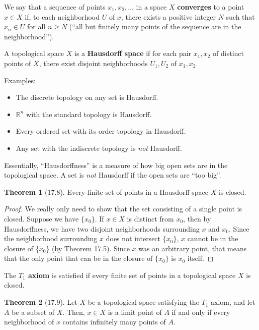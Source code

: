 \documentclass{article}
\newcommand{\nline}{\vspace*{0.5\baselineskip}}
\theoremstyle{definition}
\newtheorem{theorem}{Theorem}[subsection]
\begin{document}
\begin{flushleft}
We say that a sequence of points $x_1, x_2, \dots$ in a space $X$ \textbf{converges} to a point $x \in X$ if, to each neighborhood $U$ of $x$, there exists a positive integer $N$ such that $x_n \in U$ for all $n \geq N$ (``all but finitely many points of the sequence are in the neighborhood'').

\nline

A topological space $X$ is a \textbf{Hausdorff space} if for each pair $x_1,x_2$ of distinct points of $X$, there exist disjoint neighborhoods $U_1, U_2$ of $x_1, x_2$.

\nline

Examples:

\begin{itemize}
    \item The discrete topology on any set is Hausdorff.
    \item $\mathbb{R}^n$ with the standard topology is Hausdorff.
    \item Every ordered set with its order topology in Hausdorff.
    \item Any set with the indiscrete topology is \textit{not} Hausdorff.
\end{itemize}

Essentially, ``Hausdorffness'' is a measure of how big open sets are in the topological space. A set is \textit{not} Hausdorff if the open sets are ``too big''.

\begin{theorem}[17.8]
Every finite set of points in a Hausdorff space $X$ is closed.
\end{theorem}

\begin{proof}
We really only need to show that the set consisting of a single point is closed. Suppose we have $\{x_0\}$. If $x \in X$ is distinct from $x_0$, then by Hausdorffness, we have two disjoint neighborhoods surrounding $x$ and $x_0$. Since the neighborhood surrounding $x$ does not intersect $\{x_0\}$, $x$ cannot be in the closure of $\{x_0\}$ (by Theorem 17.5). Since $x$ was an arbitrary point, that means that the only point that can be in the closure of $\{x_0\}$ is $x_0$ itself.
\end{proof}

The \textbf{$T_1$ axiom} is satisfied if every finite set of points in a topological space $X$ is closed.

\begin{theorem}[17.9]
Let $X$ be a topological space satisfying the $T_1$ axiom, and let $A$ be a subset of $X$. Then, $x \in X$ is a limit point of $A$ if and only if every neighborhood of $x$ contains infinitely many points of $A$.
\end{theorem}


\end{flushleft}
\end{document}
